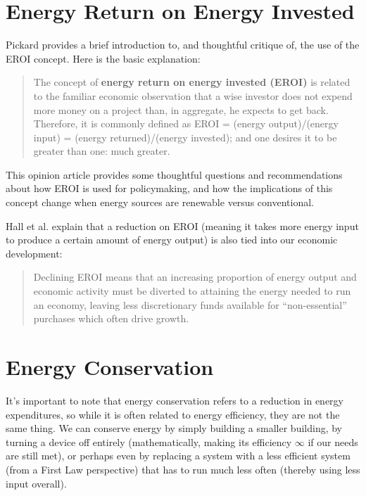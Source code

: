 \documentclass[10pt]{article}
\begin{document}
\section{Energy Return on Energy Invested}

Pickard \cite{Pickard2014-eb} provides a brief introduction to, and thoughtful critique of, the use of the EROI concept. Here is the basic explanation:

\begin{quote}
    The concept of \textbf{energy return on energy invested (EROI)} is related to the familiar economic observation that a wise investor does not expend more money on a project than, in aggregate, he expects to get back. Therefore, it is commonly defined as EROI = (energy output)/(energy input) = (energy returned)/(energy invested); and one desires it to be greater than one: much greater. \cite{Pickard2014-eb}
\end{quote}

This opinion article \cite{Pickard2014-eb} provides some thoughtful questions and recommendations about how EROI is used for policymaking, and how the implications of this concept change when energy sources are renewable versus conventional.

Hall et al. \cite{Hall2014-dc} explain that a reduction on EROI (meaning it takes more energy input to produce a certain amount of energy output) is also tied into our economic development:

\begin{quote}
     Declining EROI means that an increasing proportion of energy output and economic activity must be diverted to attaining the energy needed to run an economy, leaving less discretionary funds available for ``non-essential'' purchases which often drive growth. \cite{Hall2014-dc}
\end{quote}

\section{Energy Conservation}

It's important to note that energy conservation refers to a reduction in energy expenditures, so while it is often related to energy efficiency, they are not the same thing. We can conserve energy by simply building a smaller building, by turning a device off entirely (mathematically, making its efficiency $\infty$ if our needs are still met), or perhaps even by replacing a system with a less efficient system (from a First Law perspective) that has to run much less often (thereby using less input overall).
\end{document}
